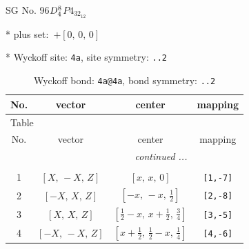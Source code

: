 \documentclass[fleqn,8pt]{jsarticle}
\begin{document}
\setcounter{MaxMatrixCols}{32}

\renewcommand{\tablename}{Table~}
\renewcommand{\figurename}{Figure~}
\begin{center}
\LARGE
SG No. 96\quad$D_{\rm 4}^{8}$\quad$P4_32_12$\quad[ tetragonal ]
\end{center}

* plus set:\,\,\,$+\left[ 0,\, 0,\, 0 \right]$


* Wyckoff site: {\tt 4a}, site symmetry: {\tt ..2}
\renewcommand{\arraystretch}{1.2}
\begin{longtable}{cccc}
\caption{Wyckoff bond: {\tt 4a@4a}, bond symmetry: {\tt ..2}}
 \\
 \hline \hline
No. & vector & center & mapping \\ \hline \endfirsthead

\multicolumn{3}{l}{\tablename\ \thetable{}} \\
 \hline \hline
No. & vector & center & mapping \\ \hline \endhead

 \hline \hline
\multicolumn{3}{r}{\footnotesize\it continued ...} \\ \endfoot

 \hline \hline
\multicolumn{3}{r}{} \\ \endlastfoot

1 & $\left[ X,\, - X,\, Z \right]$ & $\left[ x,\, x,\, 0 \right]$ & {\tt [1,-7]} \\ \hline
2 & $\left[ - X,\, X,\, Z \right]$ & $\left[ - x,\, - x,\, \frac{1}{2} \right]$ & {\tt [2,-8]} \\ \hline
3 & $\left[ X,\, X,\, Z \right]$ & $\left[ \frac{1}{2} - x,\, x + \frac{1}{2},\, \frac{3}{4} \right]$ & {\tt [3,-5]} \\ \hline
4 & $\left[ - X,\, - X,\, Z \right]$ & $\left[ x + \frac{1}{2},\, \frac{1}{2} - x,\, \frac{1}{4} \right]$ & {\tt [4,-6]} \\
\end{longtable}
\renewcommand{\arraystretch}{1.2}
\end{document}
